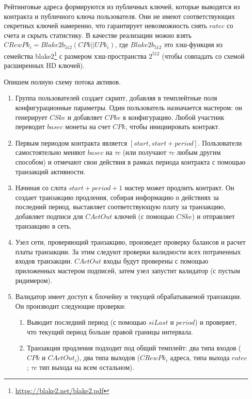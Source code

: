 \documentclass[specification,annotation]{itmo-student-thesis}
\begin{document}
Рейтинговые адреса формируются из публичных ключей, которые выводятся
из контракта и публичного ключа пользователя. Они не имеют
соответствующих секретных ключей намеренно, что гарантирует
невозможность снять $ratec$ со счета и скрыть статистику. В качестве
реализации можно взять $CRewPk_i = Blake2b_{512}(CPk || UPk_i)$, где
$Blake2b_{512}$ это хэш-функция из семейства
blake2\footnote{\url{https://blake2.net/blake2.pdf}} с размером
хэш-пространства $2^{512}$ (чтобы совпадать со схемой расширенных HD
ключей).

Опишем полную схему потока активов.

\begin{enumerate}
\item Группа пользователей создает скрипт, добавляя в темплейтные поля
  конфигурационные параметры. Один пользователь назначается мастером:
  он генерирует $CSke$ и добавляет $CPke$ в конфигурацию. Любой
  участник переводит $basec$ монеты на счет $CPk$, чтобы инициировать
  контракт.
\item Первым периодом контракта является $[start,
  start+period]$. Пользователи самостоятельно меняют $basec$ на $\tau
  c$ (или получают $\tau c$ любым другим способом) и отмечают свои
  действия в рамках периода контракта с помощью транзакций активности.
\item Начиная со слота $start + period + 1$ мастер может продлить
  контракт. Он создает транзакцию продления, собирая информацию о
  действиях за последний период, выставляет соответствующую плату за
  транзакцию, добавляет подписи для $CActOut$ ключей (с помощью
  $CSke$) и отправляет транзакцию в сеть.
\item Узел сети, проверяющий транзакцию, произведет проверку балансов
  и расчет платы транзакции. За этим следуют проверки валидности всех
  потраченных входов транзакции. $CActOut$ входы будут проверены с
  помощью приложенных мастером подписей, затем узел запустит валидатор
  (с пустым ридимером).
\item Валидатор имеет доступ к блочейну и текущей обрабатываемой
  транзакции. Он производит следующие проверки:
  \begin{enumerate}
  \item Выводит последний период (с помощью $siLast$ и $period$) и
    проверяет, что текущий период больше правой границы интервала.
  \item Транзакция продления подходит под общий темплейт: два типа
    входов ($CPk$ и $CActOut_i$), два типа выходов ($CRewPk_i$ адреса,
    типа выхода $ratec$; $\tau c$ тип выхода на всем остальном).

\end{enumerate}
\end{enumerate}
\end{document}
